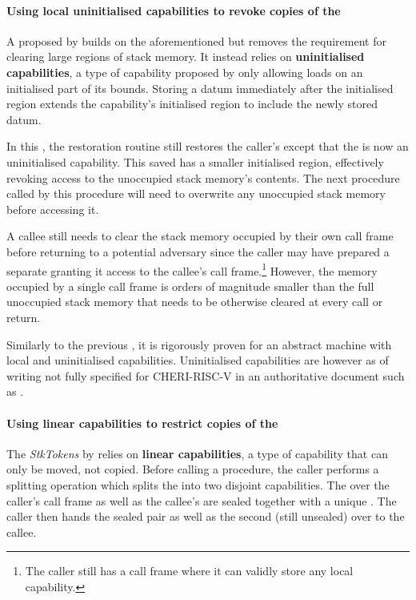 \documentclass[main.tex]{subfiles}
\begin{document}
\paragraph{Using local uninitialised capabilities to revoke copies of the } A  proposed by \cite{uninitcapss,uninitcaps} builds on the aforementioned  but removes the requirement for clearing large regions of stack memory. It instead relies on \textbf{uninitialised capabilities}, a type of capability proposed by \cite{uninitcapss} only allowing loads on an initialised part of its bounds. Storing a datum immediately after the initialised region extends the capability's initialised region to include the newly stored datum.

In this , the restoration routine still restores the caller's  except that the  is now an uninitialised capability. This saved  has a smaller initialised region, effectively revoking access to the unoccupied stack memory's contents. The next procedure called by this procedure will need to overwrite any unoccupied stack memory before accessing it.

A callee still needs to clear the stack memory occupied by their own call frame before returning to a potential adversary since the caller may have prepared a separate  granting it access to the callee's call frame.\footnote{The caller still has a call frame where it can validly store any local capability.} However, the memory occupied by a single call frame is orders of magnitude smaller than the full unoccupied stack memory that needs to be otherwise cleared at every call or return.

Similarly to the previous , it is rigorously proven for an abstract machine with local and uninitialised capabilities. Uninitialised capabilities are however as of writing not fully specified for CHERI-RISC-V in an authoritative document such as \cite{cheri}.

\paragraph{Using linear capabilities to restrict copies of the } The \emph{StkTokens}  by \cite{stktokens} relies on \textbf{linear capabilities}, a type of capability that can only be moved, not copied. Before calling a procedure, the caller performs a splitting operation which splits the  into two disjoint capabilities. The  over the caller's call frame as well as the callee's  are sealed together with a unique . The caller then hands the sealed pair as well as the second (still unsealed)  over to the callee.
\end{document}
